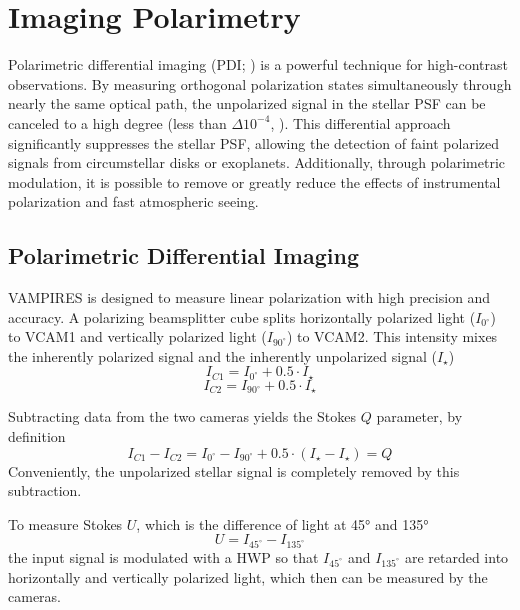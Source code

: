 \section{Imaging Polarimetry}\label{sec:polarimetry}

Polarimetric differential imaging (PDI; \citealp{kuhn_imaging_2001}) is a powerful technique for high-contrast observations. By measuring orthogonal polarization states simultaneously through nearly the same optical path, the unpolarized signal in the stellar PSF can be canceled to a high degree (less than $\Delta10^{-4}$, \citealp{schmid_spherezimpol_2018}). This differential approach significantly suppresses the stellar PSF, allowing the detection of faint polarized signals from circumstellar disks or exoplanets. Additionally, through polarimetric modulation, it is possible to remove or greatly reduce the effects of instrumental polarization and fast atmospheric seeing.
 
\subsection{Polarimetric Differential Imaging}

VAMPIRES is designed to measure linear polarization with high precision and accuracy. A polarizing beamsplitter cube splits horizontally polarized light ($I_{0^\circ}$) to VCAM1 and vertically polarized light ($I_{90^\circ}$) to VCAM2. This intensity mixes the inherently polarized signal and the inherently unpolarized signal ($I_\star$)
\begin{equation}
    I_{C1} = I_{0^\circ} + 0.5\cdot I_\star
\end{equation}
\begin{equation}
    I_{C2} = I_{90^\circ} + 0.5\cdot I_\star
\end{equation}

Subtracting data from the two cameras yields the Stokes $Q$ parameter, by definition
\begin{equation}
    I_{C1} - I_{C2} = I_{0^\circ} - I_{90^\circ} + 0.5\cdot \left( I_\star - I_\star\right) = Q
\end{equation}
Conveniently, the unpolarized stellar signal is completely removed by this subtraction.

To measure Stokes $U$, which is the difference of light at \ang{45} and \ang{135}
\begin{equation}
    U = I_{45^\circ} - I_{135^\circ}
\end{equation}
the input signal is modulated with a HWP so that $I_{45^\circ}$ and $I_{135^\circ}$ are retarded into horizontally and vertically polarized light, which then can be measured by the cameras.

